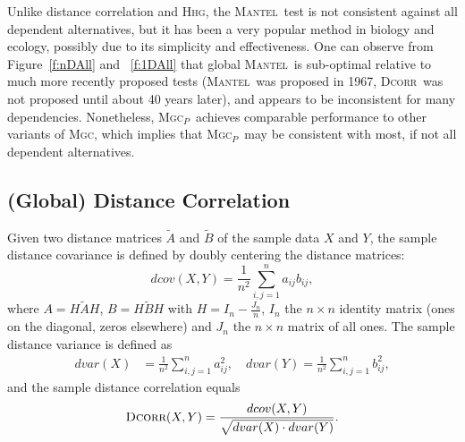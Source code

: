 \documentclass[11pt]{article}
\providecommand{\sct}[1]{{\normalfont\textsc{#1}}}
\newcommand{\Mgc}{\sct{Mgc}}
\newcommand{\Mgcp}{\sct{Mgc$_P$}}
\newcommand{\Hhg}{\sct{Hhg}}
\newcommand{\Dcorr}{\sct{Dcorr}}
\newcommand{\Mantel}{\sct{Mantel}}
\begin{document}
Unlike distance correlation and \Hhg, the \Mantel~test is not consistent against all dependent alternatives, but it has been a very popular method in biology and ecology, possibly due to its simplicity and effectiveness. One can observe from Figure~\ref{f:nDAll} and ~\ref{f:1DAll} that global \Mantel~is sub-optimal relative to much more recently proposed tests (\Mantel~was proposed in 1967, \Dcorr~was not proposed until about 40 years later), and appears to be inconsistent for many dependencies. Nonetheless,  \Mgcp~achieves comparable performance to other variants of \Mgc, which implies that \Mgcp~may be consistent with most, if not all dependent alternatives.
%
%
%

\subsection{(Global) Distance Correlation}
\label{appen:dcorr}
Given two distance matrices $\tilde{A}$ and $\tilde{B}$ of the sample data $X$ and $Y$, the sample distance covariance is defined by doubly centering the distance matrices:
\begin{equation*}
\label{dcovEqu}
dcov(X,Y)=\frac{1}{n^2}\sum_{i,j=1}^{n}a_{ij}b_{ij},
\end{equation*}
where $A=H\tilde{A}H$, $B=H\tilde{B}H$ with $H=I_{n}-\frac{J_{n}}{n}$, $I_n$ the $n \times n$ identity matrix (ones on the diagonal, zeros elsewhere)  and $J_n$ the $n \times n$ matrix of all ones. The sample distance variance is defined as
\begin{align*}
dvar(X) &=\frac{1}{n^2}\sum_{i,j=1}^{n}a_{ij}^{2},\quad dvar(Y) =\frac{1}{n^2}\sum_{i,j=1}^{n}b_{ij}^{2},
\end{align*}
and the sample distance correlation equals
\begin{equation*}
\Dcorr(X,Y)=\frac{dcov(X,Y)}{\sqrt{dvar(X) \cdot dvar(Y)}}.
\end{equation*}
\end{document}
